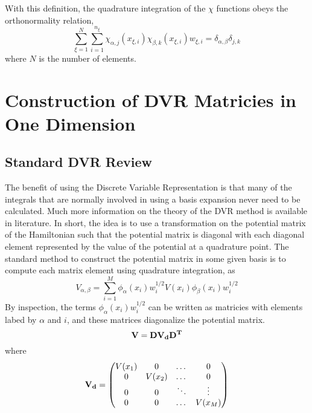 \documentclass[preprint]{revtex4}
\begin{document}
With this definition, the quadrature integration of the $\chi$ functions obeys the
orthonormality relation, 
\begin{equation}
\label{chiortho}
\sum_{\xi=1}^N\sum_{i=1}^{n_\xi}\chi_{\alpha,j}(x_{\xi,i})\chi_{\beta,k}(x_{\xi,i})w_{\xi,i}
=\delta_{\alpha,\beta}\delta_{j,k}
\end{equation}
where $N$ is the number of elements. 


\section{Construction of DVR Matricies in One Dimension}
\subsection{Standard DVR Review}
The benefit of using the Discrete Variable Representation is that many of the
integrals that are normally involved in using a basis expansion never need to be
calculated. Much more information on the theory of the DVR method is available in
literature\cite{DVR1986,DVR1990}. In short, the idea is to use a transformation on the 
potential matrix of the Hamiltonian such that the potential matrix is diagonal with
each diagonal element represented by the value of the potential at a quadrature 
point. 
The standard method to construct the potential matrix in some given basis 
is to compute each matrix element using quadrature integration, as
\begin{equation}
\label{Vmatel}
V_{\alpha,\beta}=\sum_{i=1}^{M}\phi_{\alpha}(x_{i})w_i^{1/2}V(x_{i})\phi_{\beta}(x_{i})w_{i}^{1/2}
\end{equation}
By inspection, the terms $\phi_\alpha(x_i)w_i^{1/2}$ can be written as matricies with elements
labed by $\alpha$ and $i$, and these matrices diagonalize the potential matrix. 
\begin{equation}
\label{Vdiag}
{\bf V}={\bf D} {\bf V_d} {\bf D^T}
\end{equation}
where
\begin{equation}
\label{Vdiagdef}
{\bf V_d}=
\begin{pmatrix}
V(x_1) & 0 & \dots & 0 \\
0 & V(x_2) & \dots & 0 \\
0 & 0 &\ddots & \vdots \\
0 & 0 & \dots & V(x_M) 
\end{pmatrix}
\end{equation}
\end{document}
